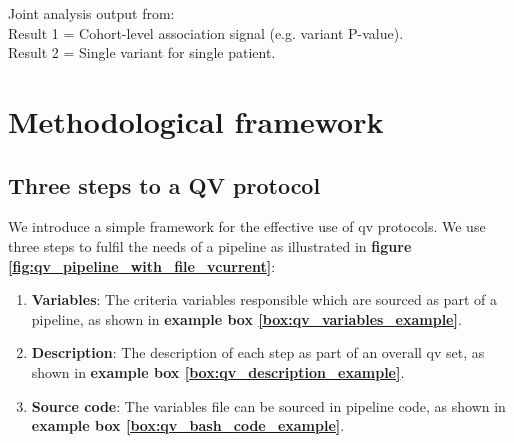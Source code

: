 \begin{tcolorbox}[
    colback=white!0,  %
    colframe=black,  %
    boxrule=1pt,  %
    arc=1mm,  %
    outer arc=1mm,
   title=\textbf{\refstepcounter{myboxcounter}\label{box:pipe}Box \themyboxcounter: Example diagrammatic representation}
]


Joint analysis output from:\\
Result 1 = Cohort-level association signal (e.g. variant P-value). \\
Result 2 = Single variant for single patient.
\end{tcolorbox}


\section{Methodological framework}
\subsection{Three steps to a QV protocol}
We introduce 
a simple framework for the effective use of \ac{qv} protocols.
We use three steps to fulfil the needs of a pipeline as illustrated in 
\textbf{figure 
\ref{fig:qv_pipeline_with_file_vcurrent}}:
\begin{enumerate}
\item \textbf{Variables}: The criteria variables responsible which are sourced as part of a pipeline, as shown in \textbf{example box \ref{box:qv_variables_example}}.
\item \textbf{Description}: The description of each step as part of an overall \ac{qv} set, as shown in \textbf{example box \ref{box:qv_description_example}}.
\item \textbf{Source code}: The variables file can be sourced in pipeline code, as shown in \textbf{example box \ref{box:qv_bash_code_example}}.
\end{enumerate}

